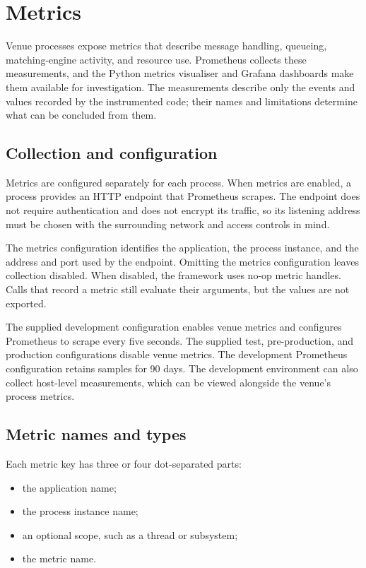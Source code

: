 \chapter{Metrics}
\label{ch:metrics}

Venue processes expose metrics that describe message handling, queueing, matching-engine
activity, and resource use. Prometheus collects these measurements, and the Python metrics
visualiser and Grafana dashboards make them available for investigation. The measurements
describe only the events and values recorded by the instrumented code; their names and
limitations determine what can be concluded from them.

\section{Collection and configuration}

Metrics are configured separately for each process. When metrics are enabled, a process
provides an HTTP endpoint that Prometheus scrapes. The endpoint does not require
authentication and does not encrypt its traffic, so its listening address must be chosen
with the surrounding network and access controls in mind.

The metrics configuration identifies the application, the process instance, and the
address and port used by the endpoint. Omitting the metrics configuration leaves
collection disabled. When disabled, the framework uses no-op metric handles. Calls that
record a metric still evaluate their arguments, but the values are not exported.

The supplied development configuration enables venue metrics and configures Prometheus
to scrape every five seconds. The supplied test, pre-production, and production
configurations disable venue metrics. The development Prometheus configuration retains
samples for 90 days. The development environment can also collect host-level measurements,
which can be viewed alongside the venue's process metrics.

\section{Metric names and types}

Each metric key has three or four dot-separated parts:
\begin{itemize}
  \item the application name;
  \item the process instance name;
  \item an optional scope, such as a thread or subsystem;
  \item the metric name.
\end{itemize}

